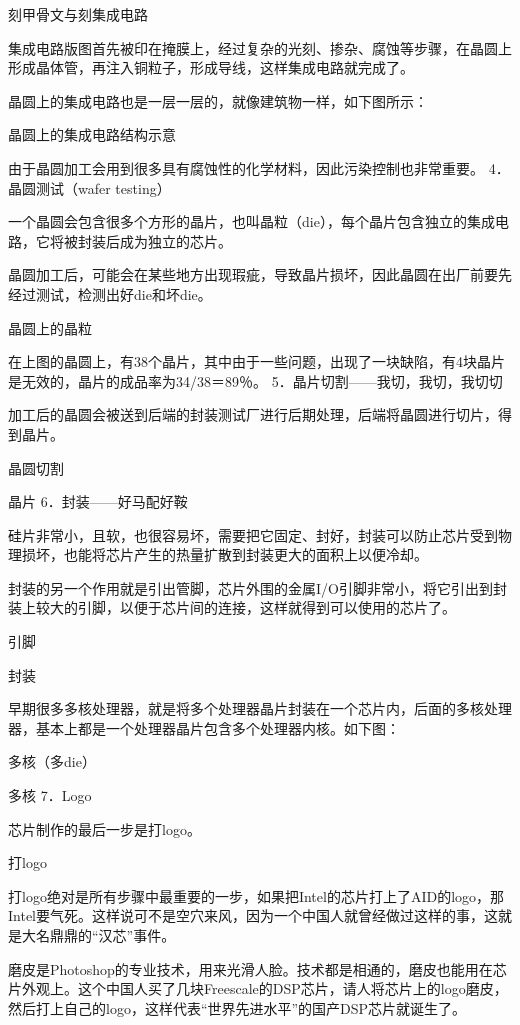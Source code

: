 \documentclass[12pt,UTF8]{ctexbook}
\begin{document}
刻甲骨文与刻集成电路

集成电路版图首先被印在掩膜上，经过复杂的光刻、掺杂、腐蚀等步骤，在晶圆上形成晶体管，再注入铜粒子，形成导线，这样集成电路就完成了。

晶圆上的集成电路也是一层一层的，就像建筑物一样，如下图所示：

晶圆上的集成电路结构示意

由于晶圆加工会用到很多具有腐蚀性的化学材料，因此污染控制也非常重要。
4．晶圆测试（wafer testing）

一个晶圆会包含很多个方形的晶片，也叫晶粒（die），每个晶片包含独立的集成电路，它将被封装后成为独立的芯片。

晶圆加工后，可能会在某些地方出现瑕疵，导致晶片损坏，因此晶圆在出厂前要先经过测试，检测出好die和坏die。

晶圆上的晶粒

在上图的晶圆上，有38个晶片，其中由于一些问题，出现了一块缺陷，有4块晶片是无效的，晶片的成品率为34/38＝89％。
5．晶片切割——我切，我切，我切切

加工后的晶圆会被送到后端的封装测试厂进行后期处理，后端将晶圆进行切片，得到晶片。

晶圆切割

晶片
6．封装——好马配好鞍

硅片非常小，且软，也很容易坏，需要把它固定、封好，封装可以防止芯片受到物理损坏，也能将芯片产生的热量扩散到封装更大的面积上以便冷却。

封装的另一个作用就是引出管脚，芯片外围的金属I/O引脚非常小，将它引出到封装上较大的引脚，以便于芯片间的连接，这样就得到可以使用的芯片了。

引脚

封装

早期很多多核处理器，就是将多个处理器晶片封装在一个芯片内，后面的多核处理器，基本上都是一个处理器晶片包含多个处理器内核。如下图：

多核（多die）

多核
7．Logo

芯片制作的最后一步是打logo。

打logo

打logo绝对是所有步骤中最重要的一步，如果把Intel的芯片打上了AID的logo，那Intel要气死。这样说可不是空穴来风，因为一个中国人就曾经做过这样的事，这就是大名鼎鼎的“汉芯”事件。

磨皮是Photoshop的专业技术，用来光滑人脸。技术都是相通的，磨皮也能用在芯片外观上。这个中国人买了几块Freescale的DSP芯片，请人将芯片上的logo磨皮，然后打上自己的logo，这样代表“世界先进水平”的国产DSP芯片就诞生了。
\end{document}
